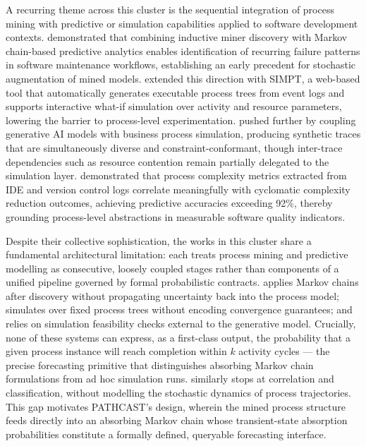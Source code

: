 
A recurring theme across this cluster is the sequential integration of process mining with predictive or simulation capabilities applied to software development contexts. \cite{gupta2017} demonstrated that combining inductive miner discovery with Markov chain-based predictive analytics enables identification of recurring failure patterns in software maintenance workflows, establishing an early precedent for stochastic augmentation of mined models. \cite{pourbafrani2021} extended this direction with SIMPT, a web-based tool that automatically generates executable process trees from event logs and supports interactive what-if simulation over activity and resource parameters, lowering the barrier to process-level experimentation. \cite{buliga2025} pushed further by coupling generative AI models with business process simulation, producing synthetic traces that are simultaneously diverse and constraint-conformant, though inter-trace dependencies such as resource contention remain partially delegated to the simulation layer. \cite{caldeira2022} demonstrated that process complexity metrics extracted from IDE and version control logs correlate meaningfully with cyclomatic complexity reduction outcomes, achieving predictive accuracies exceeding 92\%, thereby grounding process-level abstractions in measurable software quality indicators.

Despite their collective sophistication, the works in this cluster share a fundamental architectural limitation: each treats process mining and predictive modelling as consecutive, loosely coupled stages rather than components of a unified pipeline governed by formal probabilistic contracts. \cite{gupta2017} applies Markov chains after discovery without propagating uncertainty back into the process model; \cite{pourbafrani2021} simulates over fixed process trees without encoding convergence guarantees; and \cite{buliga2025} relies on simulation feasibility checks external to the generative model. Crucially, none of these systems can express, as a first-class output, the probability that a given process instance will reach completion within $k$ activity cycles — the precise forecasting primitive that distinguishes absorbing Markov chain formulations from ad hoc simulation runs. \cite{caldeira2022} similarly stops at correlation and classification, without modelling the stochastic dynamics of process trajectories. This gap motivates PATHCAST's design, wherein the mined process structure feeds directly into an absorbing Markov chain whose transient-state absorption probabilities constitute a formally defined, queryable forecasting interface.


